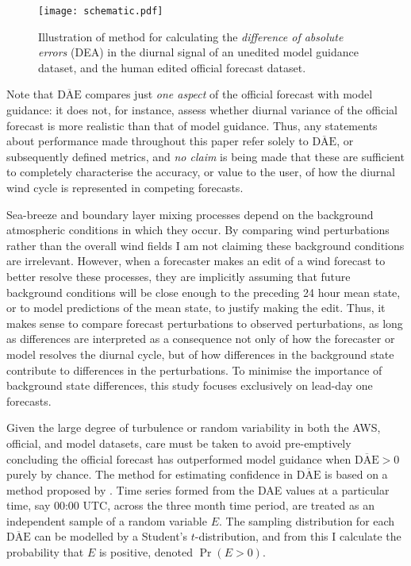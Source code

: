 \documentclass[twocol]{ametsoc}
\DeclareMathOperator{\pr}{Pr}
\begin{document}
\begin{figure}
\centering
\texttt{[image: schematic.pdf]}
\caption{Illustration of method for calculating the \textit{difference of absolute errors} (DEA) in the diurnal signal of an unedited model guidance dataset, and the human edited official forecast dataset.}
\label{Fig:schematic}
\end{figure}

Note that $\overline{\text{DAE}}$ compares just \textit{one aspect} of the official forecast with model guidance: it does not, for instance, assess whether diurnal variance of the official forecast is more realistic than that of model guidance. Thus, any statements about performance made throughout this paper refer solely to $\overline{\text{DAE}}$, or subsequently defined metrics, and \textit{no claim} is being made that these are sufficient to completely characterise the accuracy, or value to the user, of how the diurnal wind cycle is represented in competing forecasts.

Sea-breeze and boundary layer mixing processes depend on the background atmospheric conditions in which they occur. By comparing wind perturbations rather than the overall wind fields I am not claiming these background conditions are irrelevant. However, when a forecaster makes an edit of a wind forecast to better resolve these processes, they are implicitly assuming that future background conditions will be close enough to the preceding 24 hour mean state, or to model predictions of the mean state, to justify making the edit. Thus, it makes sense to compare forecast perturbations to observed perturbations, as long as differences are interpreted as a consequence not only of how the forecaster or model resolves the diurnal cycle, but of how differences in the background state contribute to differences in the perturbations. To minimise the importance of background state differences, this study focuses exclusively on lead-day one forecasts.

Given the large degree of turbulence or random variability in both the AWS, official, and model datasets, care must be taken to avoid pre-emptively concluding the official forecast has outperformed model guidance when $\overline{\text{DAE}}>0$ purely by chance. The method for estimating confidence in $\overline{\text{DAE}}$ is based on a method proposed by \citet{griffiths17}. Time series formed from the DAE values at a particular time, say 00:00 UTC, across the three month time period, are treated as an independent sample of a random variable $E$. The sampling distribution for each $\overline{\text{DAE}}$ can be modelled by a Student's $t$-distribution, and from this I calculate the probability that $E$ is positive, denoted $\pr\left(E > 0\right)$. 
\end{document}
